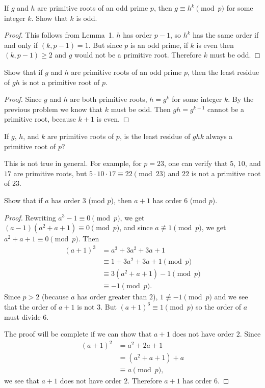  If $g$ and $h$ are primitive roots of an odd prime $p$,
then $g \equiv h^k\pmod{p}$ for some integer $k$. Show that $k$ is
odd.
\begin{proof}
  This follows from Lemma~1. $h$ has order $p - 1$, so $h^k$ has the
  same order if and only if $(k,p-1) = 1$. But since $p$ is an odd
  prime, if $k$ is even then $(k,p-1)\geq2$ and $g$ would not be a
  primitive root. Therefore $k$ must be odd.
\end{proof}

 Show that if $g$ and $h$ are primitive roots of an odd
prime $p$, then the least residue of $gh$ is not a primitive root of
$p$.
\begin{proof}
  Since $g$ and $h$ are both primitive roots, $h = g^k$ for some
  integer $k$. By the previous problem we know that $k$ must be
  odd. Then $gh = g^{k+1}$ cannot be a primitive root, because $k+1$
  is even.
\end{proof}

 If $g$, $h$, and $k$ are primitive roots of $p$, is the
least residue of $ghk$ always a primitive root of $p$?
\begin{solution}
  This is not true in general. For example, for $p = 23$, one can
  verify that $5$, $10$, and $17$ are primitive roots, but
  $5\cdot10\cdot17\equiv22\pmod{23}$ and $22$ is not a primitive root
  of $23$.
\end{solution}

 Show that if $a$ has order $3$ (mod $p$), then $a + 1$
has order $6$ (mod $p$).
\begin{proof}
  Rewriting $a^3 - 1\equiv0\pmod{p}$, we get
  $(a - 1)(a^2 + a + 1) \equiv 0\pmod{p}$, and since
  $a\not\equiv1\pmod{p}$, we get $a^2 + a + 1\equiv0\pmod{p}$. Then
  \begin{align*}
    (a + 1)^3
    &= a^3 + 3a^2 + 3a + 1 \\
    &\equiv 1 + 3a^2 + 3a + 1 \pmod{p} \\
    &\equiv 3(a^2 + a + 1) - 1 \pmod{p} \\
    &\equiv -1 \pmod{p}.
  \end{align*}
  Since $p > 2$ (because $a$ has order greater than $2$),
  $1\not\equiv-1\pmod{p}$ and we see that the order of $a+1$ is not
  $3$. But $(a+1)^6\equiv1\pmod{p}$ so the order of $a$ must divide
  $6$.

  The proof will be complete if we can show that $a+1$ does not have
  order $2$. Since
  \begin{align*}
    (a + 1)^2 &= a^2 + 2a + 1 \\
              &= (a^2 + a + 1) + a \\
              &\equiv a\pmod{p},
  \end{align*}
  we see that $a+1$ does not have order $2$. Therefore $a+1$ has order
  $6$.
\end{proof}

